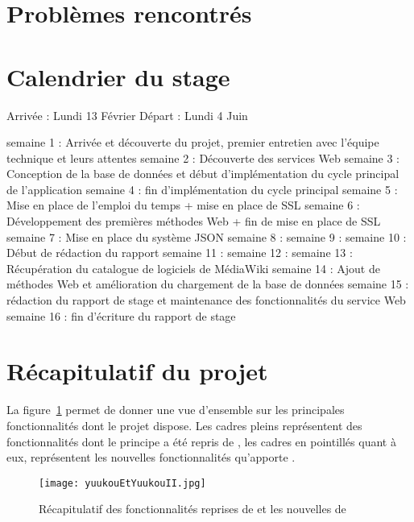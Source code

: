\section{Probl\`emes rencontr\'es}

\section{Calendrier du stage}
Arriv\'ee : Lundi 13 F\'evrier
D\'epart : Lundi 4 Juin

semaine 1 : Arriv\'ee et d\'ecouverte du projet, premier entretien avec l'\'equipe technique et leurs attentes
semaine 2 : D\'ecouverte des services Web 
semaine 3 : Conception de la base de donn\'ees et d\'ebut d'impl\'ementation du cycle principal de l'application
semaine 4 : fin d'impl\'ementation du cycle principal
semaine 5 : Mise en place de l'emploi du temps + mise en place de SSL
semaine 6 : D\'eveloppement des premi\`eres m\'ethodes Web + fin de mise en place de SSL
semaine 7 : Mise en place du syst\`eme JSON
semaine 8 : 
semaine 9 : 
semaine 10 : D\'ebut de r\'edaction du rapport
semaine 11 : 
semaine 12 : 
semaine 13 : R\'ecup\'eration du catalogue de logiciels de M\'ediaWiki
semaine 14 : Ajout de m\'ethodes Web et am\'elioration du chargement de la base de donn\'ees
semaine 15 : r\'edaction du rapport de stage et maintenance des fonctionnalit\'es du service Web
semaine 16 : fin d'\'ecriture du rapport de stage

\section{R\'ecapitulatif du projet}

La figure~\ref{figure:yuukouEtYuukouII} permet de donner une vue d'ensemble sur les principales fonctionnalit\'es dont le projet dispose.
Les cadres pleins repr\'esentent des fonctionnalit\'es dont le principe a \'et\'e repris de {\Yuukou}, les cadres en pointill\'es quant \`a eux, repr\'esentent les nouvelles fonctionnalit\'es qu'apporte \YuukouII.

\begin{figure}[!ht]
	\centering
	\texttt{[image: yuukouEtYuukouII.jpg]}
	\caption{R\'ecapitulatif des fonctionnalit\'es reprises de {\Yuukou} et les nouvelles de \YuukouII}
	\label{figure:yuukouEtYuukouII}

\end{figure}



\clearpage
